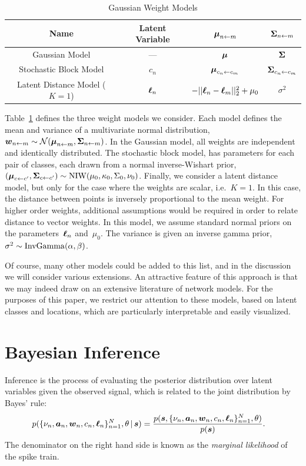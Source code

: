 \begin{table}
\begin{center}
\begin{tabular}{c|c|c|c}
Name & Latent Variable & $\boldsymbol{\mu}_{n \leftarrow m}$ & $\boldsymbol{\Sigma}_{n \leftarrow m}$\\
\hline
Gaussian Model & --- & $\boldsymbol{\mu}$ & $\boldsymbol{\Sigma}$ \\
Stochastic Block Model & $c_n$ & $\boldsymbol{\mu}_{c_n \leftarrow c_m}$ & $\boldsymbol{\Sigma}_{c_n \leftarrow c_m}$ \\
Latent Distance Model (${K=1}$) & $\boldsymbol{\ell}_n$ & $-||\boldsymbol{\ell}_n - \boldsymbol{\ell}_m||_2^2 + \mu_0$ & $\sigma^2$
\end{tabular}
\end{center}
\caption{Gaussian Weight Models}
\label{tab:W_models}
\end{table}

Table~\ref{tab:W_models} defines the three weight models we
consider.  Each model defines the mean and variance of a multivariate
normal distribution,~$\boldsymbol{w}_{n \leftarrow m} \sim \mathcal{N}(\boldsymbol{\mu}_{n \leftarrow
  m}, \boldsymbol{\Sigma}_{n \leftarrow m})$.  In the Gaussian model, all weights are
independent and identically distributed.  The stochastic block model,
has parameters for each pair of classes, each drawn from a normal
inverse-Wishart prior,~$(\boldsymbol{\mu}_{c \leftarrow c'}, \boldsymbol{\Sigma}_{c \leftarrow c'}) \sim
\mathrm{NIW}(\mu_0, \kappa_0, \Sigma_0, \nu_0)$. Finally, we
consider a latent distance model, but only for the case where the
weights are scalar, i.e.~$K=1$. In this case, the distance between
points is inversely proportional to the mean weight.  For higher order
weights, additional assumptions would be required in order to relate
distance to vector weights. In this model, we assume standard normal
priors on the parameters~$\boldsymbol{\ell}_n$ and~$\mu_0$.  The variance is given
an inverse gamma prior,~$\sigma^2 \sim \mathrm{InvGamma}(\alpha, \beta)$.

Of course, many other models could be added to this list, and in the
discussion we will consider various extensions. An attractive feature
of this approach is that we may indeed draw on an extensive literature
of network models. For the purposes of this paper, we restrict our
attention to these models, based on latent classes and locations,
which are particularly interpretable and easily visualized.


\section{Bayesian Inference}
Inference is the process of evaluating the posterior distribution over latent variables given the observed signal, which is related to the joint distribution by Bayes' rule:
\begin{align}
p(\{\nu_n, \boldsymbol{a}_n, \boldsymbol{w}_n, c_n, \boldsymbol{\ell}_n\}_{n=1}^N, \theta \,|\, \boldsymbol{s})  
  &= \frac{p(\boldsymbol{s}, \{\nu_n, \boldsymbol{a}_n, \boldsymbol{w}_n, c_n, \boldsymbol{\ell}_n\}_{n=1}^N, \theta) }{p(\boldsymbol{s})}.
\end{align}
The denominator on the right hand side is known as the \emph{marginal likelihood} of the spike train. 

